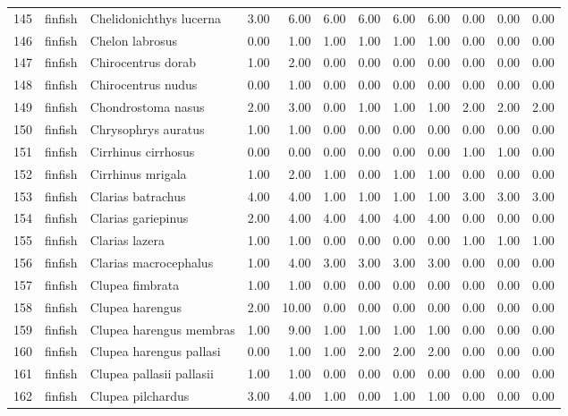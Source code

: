 \begin{table}[ht]
\begin{tabular}{rllrrrrrrrrr}
  145 & finfish & Chelidonichthys lucerna & 3.00 & 6.00 & 6.00 & 6.00 & 6.00 & 6.00 & 0.00 & 0.00 & 0.00 \\ 
  146 & finfish & Chelon labrosus & 0.00 & 1.00 & 1.00 & 1.00 & 1.00 & 1.00 & 0.00 & 0.00 & 0.00 \\ 
  147 & finfish & Chirocentrus dorab & 1.00 & 2.00 & 0.00 & 0.00 & 0.00 & 0.00 & 0.00 & 0.00 & 0.00 \\ 
  148 & finfish & Chirocentrus nudus & 0.00 & 1.00 & 0.00 & 0.00 & 0.00 & 0.00 & 0.00 & 0.00 & 0.00 \\ 
  149 & finfish & Chondrostoma nasus & 2.00 & 3.00 & 0.00 & 1.00 & 1.00 & 1.00 & 2.00 & 2.00 & 2.00 \\ 
  150 & finfish & Chrysophrys auratus & 1.00 & 1.00 & 0.00 & 0.00 & 0.00 & 0.00 & 0.00 & 0.00 & 0.00 \\ 
  151 & finfish & Cirrhinus cirrhosus & 0.00 & 0.00 & 0.00 & 0.00 & 0.00 & 0.00 & 1.00 & 1.00 & 0.00 \\ 
  152 & finfish & Cirrhinus mrigala & 1.00 & 2.00 & 1.00 & 0.00 & 1.00 & 1.00 & 0.00 & 0.00 & 0.00 \\ 
  153 & finfish & Clarias batrachus & 4.00 & 4.00 & 1.00 & 1.00 & 1.00 & 1.00 & 3.00 & 3.00 & 3.00 \\ 
  154 & finfish & Clarias gariepinus & 2.00 & 4.00 & 4.00 & 4.00 & 4.00 & 4.00 & 0.00 & 0.00 & 0.00 \\ 
  155 & finfish & Clarias lazera & 1.00 & 1.00 & 0.00 & 0.00 & 0.00 & 0.00 & 1.00 & 1.00 & 1.00 \\ 
  156 & finfish & Clarias macrocephalus & 1.00 & 4.00 & 3.00 & 3.00 & 3.00 & 3.00 & 0.00 & 0.00 & 0.00 \\ 
  157 & finfish & Clupea fimbrata & 1.00 & 1.00 & 0.00 & 0.00 & 0.00 & 0.00 & 0.00 & 0.00 & 0.00 \\ 
  158 & finfish & Clupea harengus & 2.00 & 10.00 & 0.00 & 0.00 & 0.00 & 0.00 & 0.00 & 0.00 & 0.00 \\ 
  159 & finfish & Clupea harengus membras & 1.00 & 9.00 & 1.00 & 1.00 & 1.00 & 1.00 & 0.00 & 0.00 & 0.00 \\ 
  160 & finfish & Clupea harengus pallasi & 0.00 & 1.00 & 1.00 & 2.00 & 2.00 & 2.00 & 0.00 & 0.00 & 0.00 \\ 
  161 & finfish & Clupea pallasii pallasii & 1.00 & 1.00 & 0.00 & 0.00 & 0.00 & 0.00 & 0.00 & 0.00 & 0.00 \\ 
  162 & finfish & Clupea pilchardus & 3.00 & 4.00 & 1.00 & 0.00 & 1.00 & 1.00 & 0.00 & 0.00 & 0.00 \\ 

\end{tabular}
\end{table}
